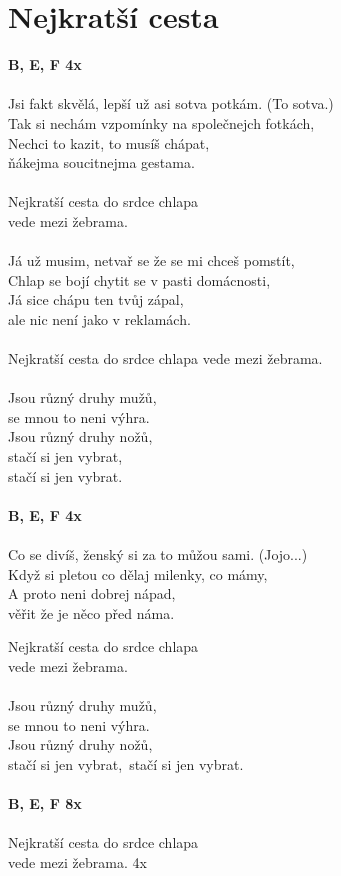 \section{Nejkratší cesta}
\footnotesize\textbf{B, E\be, F 4x}\\
\normalsize
\\
Jsi fakt skvělá, lepší už asi sotva potkám. (To sotva.)\\
Tak si nechám vzpomínky na společnejch fotkách,\\
Nechci to kazit, to musíš chápat,\\
ňákejma soucitnejma gestama.\\
\\
Nejkratší cesta do srdce chlapa\\
vede mezi žebrama.\\
\\
Já už musim, netvař se že se mi chceš pomstít,\\
Chlap se bojí chytit se v pasti domácnosti,\\
Já sice chápu ten tvůj zápal,\\
ale nic není jako v reklamách.\\
\\
Nejkratší cesta do srdce chlapa vede mezi žebrama.\\
\\
Jsou různý druhy mužů,\\
se mnou to neni výhra.\\
Jsou různý druhy nožů,\\
stačí si jen vybrat,\\
stačí si jen vybrat.\\
\\
\footnotesize\textbf{B, E\be, F 4x}\\
\normalsize
\\
Co se divíš, ženský si za to můžou sami. (Jojo...)\\
Když si pletou co dělaj milenky, co mámy,\\
A proto neni dobrej nápad,\\
věřit že je něco před náma.
\begin{multicols}{2}
Nejkratší cesta do srdce chlapa\\
vede mezi žebrama.\\
\\
Jsou různý druhy mužů,\\
se mnou to neni výhra.\\
Jsou různý druhy nožů,\\
stačí si jen vybrat,\
stačí si jen vybrat.\\
\\
\footnotesize\textbf{B, E\be, F 8x}\\
\normalsize
\\
Nejkratší cesta do srdce chlapa\\
vede mezi žebrama. 4x\\
\end{multicols}
